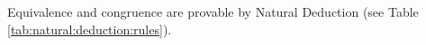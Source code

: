 %
\begin{lemma}Equivalence and congruence are  provable by Natural Deduction (see Table \vref{tab:natural:deduction:rules}).\end{lemma}
